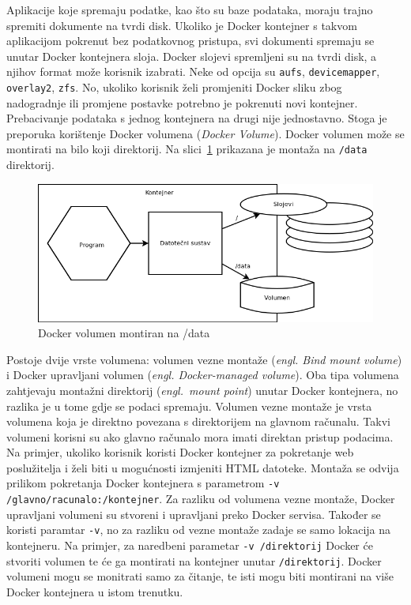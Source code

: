Aplikacije koje spremaju podatke, kao što su baze podataka, moraju trajno spremiti dokumente na
tvrdi disk. Ukoliko je Docker kontejner s takvom aplikacijom pokrenut bez podatkovnog pristupa, svi
dokumenti spremaju se unutar Docker kontejnera sloja. Docker slojevi spremljeni su na tvrdi disk,
a njihov format može korisnik izabrati. Neke od opcija su \texttt{aufs}, \texttt{devicemapper},
\texttt{overlay2}, \texttt{zfs}.
No, ukoliko korisnik želi promjeniti Docker sliku zbog nadogradnje ili promjene postavke potrebno je
pokrenuti novi kontejner. Prebacivanje podataka s jednog kontejnera na drugi nije jednostavno. Stoga
je preporuka korištenje Docker volumena (\textit{Docker Volume}). Docker volumen može se montirati
na bilo koji direktorij. Na slici~\ref{fig:02docker_volume} prikazana je montaža na \texttt{/data}
direktorij.

\begin{figure}[h]
    \centering
    \includegraphics[width=\textwidth]{img/02/docker_volume.png}
    \caption{Docker volumen montiran na /data}%
    \label{fig:02docker_volume}
\end{figure}

Postoje dvije vrste volumena: volumen vezne montaže (\textit{engl. Bind mount volume}) i Docker
upravljani volumen (\textit{engl. Docker-managed volume}). Oba tipa volumena zahtjevaju montažni
direktorij (\textit{engl.~mount point}) unutar Docker kontejnera, no razlika je u tome gdje se
podaci spremaju. Volumen vezne montaže je vrsta volumena koja je direktno povezana s direktorijem na
glavnom računalu. Takvi volumeni korisni su ako glavno računalo mora imati direktan pristup
podacima. Na primjer, ukoliko korisnik koristi Docker kontejner za pokretanje web poslužitelja i
želi biti u mogućnosti izmjeniti HTML datoteke. Montaža se odvija prilikom pokretanja Docker
kontejnera s parametrom \texttt{-v /glavno/racunalo:/kontejner}. Za razliku od volumena vezne
montaže, Docker upravljani volumeni su stvoreni i upravljani preko Docker servisa. Također se
koristi paramtar \texttt{-v}, no za razliku od vezne montaže zadaje se samo lokacija na kontejneru.
Na primjer, za naredbeni parametar \texttt{-v /direktorij} Docker će stvoriti volumen te će ga
montirati na kontejner unutar \texttt{/direktorij}. Docker volumeni mogu se monitrati samo za
čitanje, te isti mogu biti montirani na više Docker kontejnera u istom trenutku.

